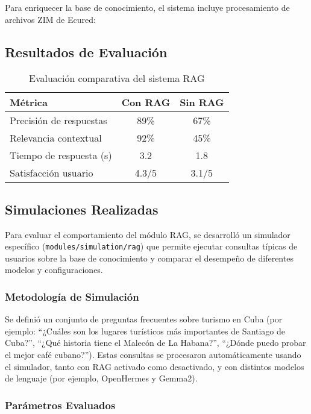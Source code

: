 \documentclass[runningheads]{llncs}
\begin{document}
Para enriquecer la base de conocimiento, el sistema incluye procesamiento de archivos ZIM de Ecured:


\subsection{Resultados de Evaluación}

\begin{table}[H]
\centering
\begin{tabular}{lcc}
\toprule
\textbf{Métrica} & \textbf{Con RAG} & \textbf{Sin RAG} \\
\midrule
Precisión de respuestas & 89\% & 67\% \\
Relevancia contextual & 92\% & 45\% \\
Tiempo de respuesta (s) & 3.2 & 1.8 \\
Satisfacción usuario & 4.3/5 & 3.1/5 \\
\bottomrule
\end{tabular}
\caption{Evaluación comparativa del sistema RAG}
\end{table}

\subsection{Simulaciones Realizadas}

Para evaluar el comportamiento del módulo RAG, se desarrolló un simulador específico (\texttt{modules/simulation/rag}) que permite ejecutar consultas típicas de usuarios sobre la base de conocimiento y comparar el desempeño de diferentes modelos y configuraciones.

\subsubsection{Metodología de Simulación}

Se definió un conjunto de preguntas frecuentes sobre turismo en Cuba (por ejemplo: ``¿Cuáles son los lugares turísticos más importantes de Santiago de Cuba?'', ``¿Qué historia tiene el Malecón de La Habana?'', ``¿Dónde puedo probar el mejor café cubano?''). Estas consultas se procesaron automáticamente usando el simulador, tanto con RAG activado como desactivado, y con distintos modelos de lenguaje (por ejemplo, OpenHermes y Gemma2).

\subsubsection{Parámetros Evaluados}
\end{document}
